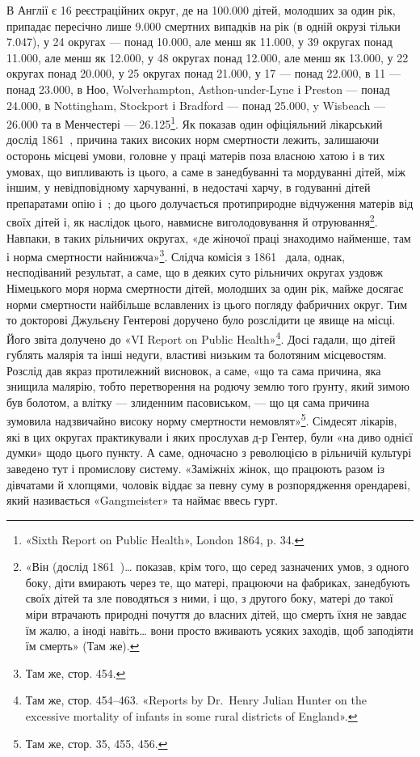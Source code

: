 \parcont{}  %
В Англії є 16 реєстраційних округ, де на \num{100.000} дітей, молодших
за один рік, припадає пересічно лише \num{9.000} смертних випадків
на рік (в одній окрузі тільки \num{7.047}), у 24 округах — понад \num{10.000},
але менш як \num{11.000}, у 39 округах понад \num{11.000}, але менш як \num{12.000},
у 48 округах понад \num{12.000}, але менш як \num{13.000}, у 22 округах
понад \num{20.000}, у 25 округах понад \num{21.000}, у 17 — понад \num{22.000},
в 11 — понад \num{23.000}, в Ноо, Wolverhampton, Asthon-under-Lyne
і Preston — понад \num{24.000}, в Nottingham, Stockport і Bradford —
понад \num{25.000}, y Wisbeach — \num{26.000} та в Менчестері — \num{26.125}\footnote{
«Sixth Report on Public Health», London 1864, p. 34.
}.
Як показав один офіціяльний лікарський дослід 1861~, причина
таких високих норм смертности лежить, залишаючи осторонь
місцеві умови, головне у праці матерів поза власною хатою і в
тих умовах, що випливають із цього, а саме в занедбуванні та
мордуванні дітей, між іншим, у невідповідному харчуванні, в
недостачі харчу, в годуванні дітей препаратами опію і~;
до цього долучається протиприродне відчуження матерів від
своїх дітей і, як наслідок цього, навмисне виголодовування й
отруювання\footnote{
«Він (дослід 1861~)\dots{} показав, крім того, що серед зазначених
умов, з одного боку, діти вмирають через те, що матері, працюючи на фабриках,
занедбують своїх дітей та зле поводяться з ними, і що, з другого
боку, матері до такої міри втрачають природні почуття до власних
дітей, що смерть їхня не завдає їм жалю, а іноді навіть\dots{} вони просто вживають
усяких заходів, щоб заподіяти їм смерть» (Там же).
}. Навпаки, в таких рільничих округах, «де жіночої
праці знаходимо найменше, там і норма смертности найнижча»\footnote{
Там же, стор. 454.
}.
Слідча комісія з 1861~ дала, однак, несподіваний результат,
а саме, що в деяких суто рільничих округах уздовж Німецького
моря норма смертности дітей, молодших за один рік, майже
досягає норми смертности найбільше вславлених із цього погляду
фабричних округ. Тим то докторові Джульєну Гентерові доручено
було розслідити це явище на місці. Його звіта долучено до
«VI Report on Public Health»\footnote{
Там же, стор. 454--463. «Reports by Dr.~Henry Julian Hunter
on the excessive mortality of infants in some rural districts of England».
}. Досі гадали, що дітей гублять малярія
та інші недуги, властиві низьким та болотяним місцевостям.
Розслід дав якраз протилежний висновок, а саме, «що та сама
причина, яка знищила малярію, тобто перетворення на родючу
землю того ґрунту, який зимою був болотом, а влітку — злиденним
пасовиськом, — що ця сама причина зумовила надзвичайно
високу норму смертности немовлят»\footnote{
Там же, стор. 35, 455, 456.
}. Сімдесят лікарів, які
в цих округах практикували і яких прослухав д-р Гентер,
були «на диво однієї думки» щодо цього пункту. А саме, одночасно
з революцією в рільничій культурі заведено тут і промислову
систему. «Заміжніх жінок, що працюють разом із дівчатами й
хлопцями, чоловік віддає за певну суму в розпорядження орендареві,
який називається «Gangmeister» та наймає ввесь гурт.
\parbreak{}  %
